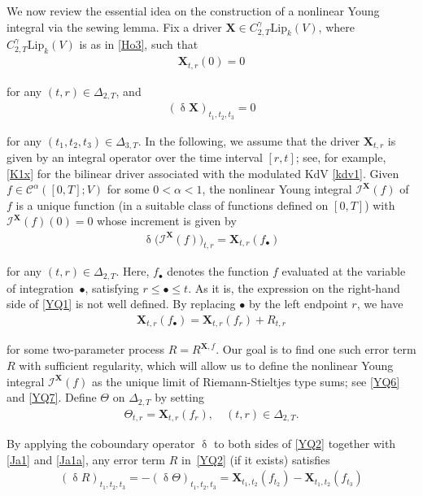 \documentclass[letterpaper, 11pt,  reqno]{amsart}
\newcommand{\1}{\hspace{0.5mm}\textup{I}\hspace{0.5mm}}
\newcommand{\I}{\mathcal{I}}
\newcommand{\noi}{\noindent}
\newcommand{\bul}{\bullet}
\newcommand{\CC}{\mathcal{C}}
\newcommand{\al}{\alpha}
\newcommand{\updl}{\updelta}
\newcommand{\Dl}{\Delta}
\newcommand{\g}{\gamma}
\newcommand{\Lip}{\mathrm{Lip}}
\newcommand{\XX}{\mathbf{X}}
\numberwithin{equation}{section}
\numberwithin{theorem}{section}
\begin{document}
 
 
We now review the essential idea
 on the construction of a nonlinear Young integral 
 via the sewing lemma.
Fix a driver  $\XX\in C^\g_{2,T}\Lip_k(V)$, where $C^\g_{2,T}\Lip_k(V)$
is as in \eqref{Ho3},  such that 
\begin{align}
\XX_{t,r}(0)=0
\label{Ja0}
\end{align} 

\noi
for any $(t,r) \in  \Dl_{2,T}$, 
and 
\begin{align}
\label{Ja1}
(\updl \XX)_{t_1,t_2,t_3} = 0
\end{align}


\noi
for any $(t_1,t_2,t_3)\in \Dl_{3,T}$.
In the following, we assume  that the driver $\XX_{t, r}$
is given by an integral operator
over the time interval $[r, t]$;
see, for example, \eqref{K1x}
for the bilinear driver associated with the modulated KdV \eqref{kdv1}.
Given 
$f\in \CC^{\al}([0,T];V)$ for some $0 < \al < 1$, 
the nonlinear Young integral $\I^\XX(f)$ of $f$
is a unique function 
(in a suitable class of functions defined on $[0, T]$)
with $\I^\XX(f)(0) = 0$
whose increment is given by 
\begin{align}
\updl 
\big(\I^\XX(f)\big)_{t, r} 
= \XX_{t, r}(f_\bul)
\label{YQ1}
\end{align}

\noi
for any $(t, r) \in\Dl_{2, T}$.
Here, $f_\bul$ denotes 
the function $f$ evaluated at the variable of integration~$\bul$, satisfying $r \le \bul \le  t$.
As it is, the expression on the right-hand side of \eqref{YQ1}
is not well defined.
By replacing $\bul$ by the left endpoint $r$, 
we have 
\begin{align}
\XX_{t, r}(f_\bul)
= \XX_{t, r}(f_r) + R_{t, r}
\label{YQ2}
\end{align}

\noi
for some two-parameter process $R = R^{\XX, f}$.
Our goal is to find one such error term $R$ with sufficient regularity, 
which will allow us to define the nonlinear Young integral
 $\I^\XX(f)$
 as the unique limit of 
Riemann-Stieltjes type sums; see \eqref{YQ6} and \eqref{YQ7}.
Define  $\Theta$ on $\Dl_{2,T}$
by setting
\begin{align}
\Theta_{t,r} = \XX_{t,r}(f_r), \quad (t,r)\in \Dl_{2,T}.
\label{Ja1a}
\end{align}


\noi
By applying the coboundary operator $\updl$
to both sides of \eqref{YQ2}
together with \eqref{Ja1} and \eqref{Ja1a}, 
any error term $R$ in~\eqref{YQ2} (if it exists) satisfies
\begin{align}
(\updl R)_{t_1, t_2, t_3}
= - (\updl  \Theta)_{t_1, t_2, t_3}
=  \XX_{t_1, t_2}( f_{t_2}) - 
  \XX_{t_1, t_2}( f_{t_3})
\label{YQ3}
\end{align}
\end{document}
